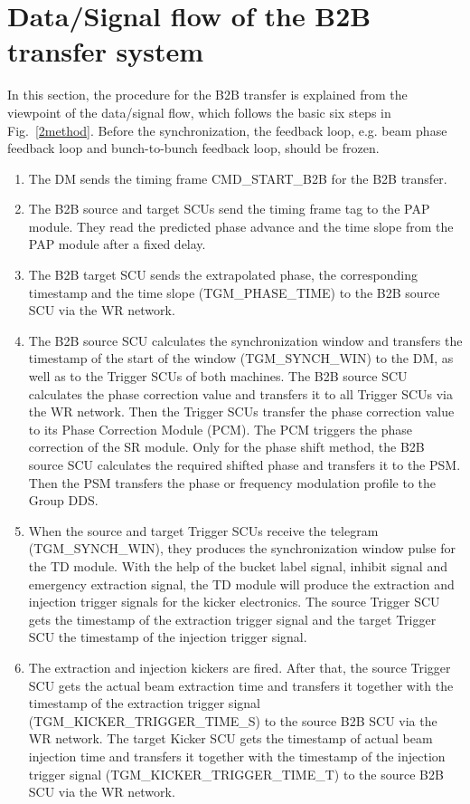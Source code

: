 \section{Data/Signal flow of the B2B transfer system}
In this section, the procedure for the B2B transfer is explained from the viewpoint of the data/signal flow, which follows the basic six steps in Fig.~\ref{2method}. Before the synchronization, the feedback loop, e.g. beam phase feedback loop and bunch-to-bunch feedback loop, should be frozen. 

\begin{enumerate}
\item The DM sends the timing frame CMD\_START\_B2B for the B2B transfer. 

\item  The B2B source and target SCUs send the timing frame tag to the PAP module. They read the predicted phase advance and the time slope from the PAP module after a fixed delay. 

\item  The B2B target SCU sends the extrapolated phase, the corresponding timestamp and the time slope (TGM\_PHASE\_TIME) to the B2B source SCU via the WR network. 

\item  The B2B source SCU calculates the synchronization window and transfers the timestamp of the start of the window (TGM\_SYNCH\_WIN) to the DM, as well as to the Trigger SCUs of both machines.
The B2B source SCU calculates the phase correction value and transfers it to all Trigger SCUs via the WR network. Then the Trigger SCUs transfer the phase correction value to its Phase Correction Module (\gls{PCM}). The PCM triggers the phase correction of the SR module. 
Only for the phase shift method, the B2B source SCU calculates the required shifted phase and transfers it to the PSM. Then the PSM transfers the phase or frequency modulation profile to the Group DDS.  

\item  When the source and target Trigger SCUs receive the telegram (TGM\_SYNCH\_WIN), they produces the synchronization window pulse for the TD module. With the help of the bucket label signal, inhibit signal and emergency extraction signal, the TD module will produce the extraction and injection trigger signals for the kicker electronics.  
The source Trigger SCU gets the timestamp of the extraction trigger signal and the target Trigger SCU the timestamp of the injection trigger signal.
\item  The extraction and injection kickers are fired. 
After that, the source Trigger SCU gets the actual beam extraction time and transfers it together with the timestamp of the extraction trigger signal (TGM\_KICKER\_TRIGGER\_TIME\_S) to the source B2B SCU via the WR network.
The target Kicker SCU gets the timestamp of actual beam injection time and transfers it together with the timestamp of the injection trigger signal (TGM\_KICKER\_TRIGGER\_TIME\_T) to the source B2B SCU via the WR network.


\end{enumerate}
